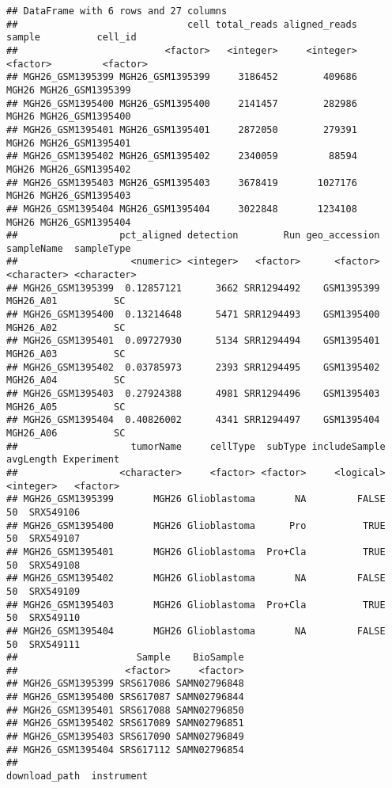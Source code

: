 \documentclass{article}\usepackage[]{graphicx}\usepackage[usenames,dvipsnames]{color}
\makeatletter
\newenvironment{kframe}{%
 \def\at@end@of@kframe{}%
 \ifinner\ifhmode%
  \def\at@end@of@kframe{\end{minipage}}%
  \begin{minipage}{\columnwidth}%
 \fi\fi%
 \def\FrameCommand##1{\hskip\@totalleftmargin \hskip-\fboxsep
 \colorbox{shadecolor}{##1}\hskip-\fboxsep
     \hskip-\linewidth \hskip-\@totalleftmargin \hskip\columnwidth}%
 \MakeFramed {\advance\hsize-\width
   \@totalleftmargin\z@ \linewidth\hsize
   \@setminipage}}%
 {\par\unskip\endMakeFramed%
 \at@end@of@kframe}
\newenvironment{knitrout}{}{} %
\makeatother
\begin{document}
\begin{knitrout}
\begin{kframe}
\begin{verbatim}
## DataFrame with 6 rows and 27 columns
##                              cell total_reads aligned_reads   sample          cell_id
##                          <factor>   <integer>     <integer> <factor>         <factor>
## MGH26_GSM1395399 MGH26_GSM1395399     3186452        409686    MGH26 MGH26_GSM1395399
## MGH26_GSM1395400 MGH26_GSM1395400     2141457        282986    MGH26 MGH26_GSM1395400
## MGH26_GSM1395401 MGH26_GSM1395401     2872050        279391    MGH26 MGH26_GSM1395401
## MGH26_GSM1395402 MGH26_GSM1395402     2340059         88594    MGH26 MGH26_GSM1395402
## MGH26_GSM1395403 MGH26_GSM1395403     3678419       1027176    MGH26 MGH26_GSM1395403
## MGH26_GSM1395404 MGH26_GSM1395404     3022848       1234108    MGH26 MGH26_GSM1395404
##                  pct_aligned detection        Run geo_accession  sampleName  sampleType
##                    <numeric> <integer>   <factor>      <factor> <character> <character>
## MGH26_GSM1395399  0.12857121      3662 SRR1294492    GSM1395399   MGH26_A01          SC
## MGH26_GSM1395400  0.13214648      5471 SRR1294493    GSM1395400   MGH26_A02          SC
## MGH26_GSM1395401  0.09727930      5134 SRR1294494    GSM1395401   MGH26_A03          SC
## MGH26_GSM1395402  0.03785973      2393 SRR1294495    GSM1395402   MGH26_A04          SC
## MGH26_GSM1395403  0.27924388      4981 SRR1294496    GSM1395403   MGH26_A05          SC
## MGH26_GSM1395404  0.40826002      4341 SRR1294497    GSM1395404   MGH26_A06          SC
##                    tumorName     cellType  subType includeSample avgLength Experiment
##                  <character>     <factor> <factor>     <logical> <integer>   <factor>
## MGH26_GSM1395399       MGH26 Glioblastoma       NA         FALSE        50  SRX549106
## MGH26_GSM1395400       MGH26 Glioblastoma      Pro          TRUE        50  SRX549107
## MGH26_GSM1395401       MGH26 Glioblastoma  Pro+Cla          TRUE        50  SRX549108
## MGH26_GSM1395402       MGH26 Glioblastoma       NA         FALSE        50  SRX549109
## MGH26_GSM1395403       MGH26 Glioblastoma  Pro+Cla          TRUE        50  SRX549110
## MGH26_GSM1395404       MGH26 Glioblastoma       NA         FALSE        50  SRX549111
##                     Sample    BioSample
##                   <factor>     <factor>
## MGH26_GSM1395399 SRS617086 SAMN02796848
## MGH26_GSM1395400 SRS617087 SAMN02796844
## MGH26_GSM1395401 SRS617088 SAMN02796850
## MGH26_GSM1395402 SRS617089 SAMN02796851
## MGH26_GSM1395403 SRS617090 SAMN02796849
## MGH26_GSM1395404 SRS617112 SAMN02796854
##                                                           download_path  instrument

\end{verbatim}
\end{kframe}
\end{knitrout}
\end{document}
